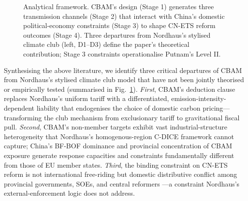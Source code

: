 \documentclass[letterpaper, 10pt, conference]{ieeeconf}
\begin{document}
\begin{figure}[!h]
\caption{Analytical framework. CBAM's design (Stage 1) generates three transmission channels (Stage 2) that interact with China's domestic political-economy constraints (Stage 3) to shape CN-ETS reform outcomes (Stage 4). Three departures from Nordhaus's stylised climate club (left, D1--D3) define the paper's theoretical contribution; Stage 3 constraints operationalise Putnam's Level II.}
\label{fig:framework}
\end{figure}
Synthesising the above literature, we identify three critical departures of CBAM from Nordhaus's stylised climate club model that have not been jointly theorised or empirically tested (summarised in Fig.~\ref{fig:framework}). \textit{First}, CBAM's deduction clause replaces Nordhaus's uniform tariff with a differentiated, emission-intensity-dependent liability that endogenises the choice of domestic carbon pricing---transforming the club mechanism from exclusionary tariff to gravitational fiscal pull. \textit{Second}, CBAM's non-member targets exhibit vast industrial-structure heterogeneity that Nordhaus's homogenous-region C-DICE framework cannot capture; China's BF-BOF dominance and provincial concentration of CBAM exposure \citep{Pan2025} generate response capacities and constraints fundamentally different from those of EU member states. \textit{Third}, the binding constraint on CN-ETS reform is not international free-riding but domestic distributive conflict among provincial governments, SOEs, and central reformers \citep{Aklin2020,Cui2021,Dai2025}---a constraint Nordhaus's external-enforcement logic does not address.
\end{document}
